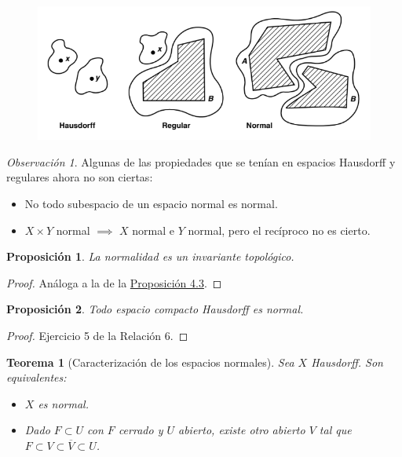 \documentclass[12pt]{report}
\newtheorem{proposition}{Proposición}[chapter]
\newtheorem{theorem}{Teorema}[chapter]
\theoremstyle{definition}
\theoremstyle{definition}
\theoremstyle{remark}
\newtheorem*{obs}{Observación} %
\begin{document}
\begin{figure}[H]
\includegraphics[scale = 0.7]{def4.3}
\centering
\end{figure}

\begin{obs}
Algunas de las propiedades que se tenían en espacios Hausdorff y regulares ahora no son ciertas:
\begin{itemize}
    \item No todo subespacio de un espacio normal es normal.
    \item $X \times Y$ normal $\implies$ $X$ normal e $Y$ normal, pero el recíproco no es cierto.
\end{itemize}
\end{obs}

\begin{proposition}
La normalidad es un invariante topológico.
\end{proposition}

\begin{proof}
Análoga a la de la \hyperref[prop4.3.]{\color{blue}Proposición 4.3}.
\end{proof}

\begin{proposition}
Todo espacio compacto Hausdorff es normal.
\end{proposition}

\begin{proof}
Ejercicio 5 de la Relación 6.
\end{proof}

\begin{theorem}[Caracterización de los espacios normales]
Sea $X$ Hausdorff. Son equivalentes:
\begin{itemize}
    \item[(i)] $X$ es normal.
    \item[(ii)] Dado $F \subset U$ con $F$ cerrado y $U$ abierto, existe otro abierto $V$ tal que $F \subset V \subset \overline{V} \subset U$.
\end{itemize}
\end{theorem}
\end{document}
